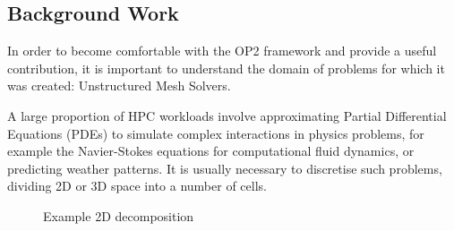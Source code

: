 \subsection{Background Work}
\label{s:bgwork}

In order to become comfortable with the OP2 framework and provide a useful contribution, it is important to understand the domain of problems for which it was created: Unstructured Mesh Solvers.
\par
A large proportion of HPC workloads involve approximating Partial Differential Equations (PDEs) to simulate complex interactions in physics problems, for example the Navier-Stokes equations for computational fluid dynamics, or predicting weather patterns. It is usually necessary to discretise such problems, dividing 2D or 3D space into a number of cells.
\begin{figure}[h!]
  \begin{minipage}{.5\textwidth}
    \centering
  \end{minipage}
\begin{minipage}{.5\textwidth}
  \centering
  \end{minipage}
  \caption{Example 2D decomposition}
  \label{fig:2dmesh}
\end{figure}
